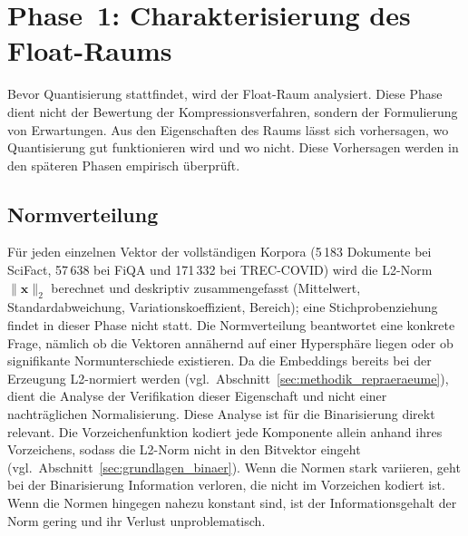 \section{Phase~1: Charakterisierung des Float-Raums}
\label{sec:methodik_phase1}
%
Bevor Quantisierung stattfindet, wird der Float-Raum analysiert.
Diese Phase dient nicht der Bewertung der Kompressionsverfahren, sondern der Formulierung von Erwartungen.
Aus den Eigenschaften des Raums lässt sich vorhersagen, wo Quantisierung gut funktionieren wird und wo nicht.
Diese Vorhersagen werden in den späteren Phasen empirisch überprüft.
%
\subsection{Normverteilung}
%
Für jeden einzelnen Vektor der vollständigen Korpora (5\,183 Dokumente bei SciFact, 57\,638 bei FiQA und 171\,332 bei TREC-COVID) wird die L2-Norm $\|\mathbf{x}\|_2$ berechnet und deskriptiv zusammengefasst (Mittelwert, Standardabweichung, Variationskoeffizient, Bereich); eine Stichprobenziehung findet in dieser Phase nicht statt.
Die Normverteilung beantwortet eine konkrete Frage, nämlich ob die Vektoren annähernd auf einer Hypersphäre liegen oder ob signifikante Normunterschiede existieren.
Da die Embeddings bereits bei der Erzeugung L2-normiert werden (vgl.\ Abschnitt~\ref{sec:methodik_repraeraeume}), dient die Analyse der Verifikation dieser Eigenschaft und nicht einer nachträglichen Normalisierung.
%
Diese Analyse ist für die Binarisierung direkt relevant.
Die Vorzeichenfunktion kodiert jede Komponente allein anhand ihres Vorzeichens, sodass die L2-Norm nicht in den Bitvektor eingeht (vgl.\ Abschnitt~\ref{sec:grundlagen_binaer}).
Wenn die Normen stark variieren, geht bei der Binarisierung Information verloren, die nicht im Vorzeichen kodiert ist.
Wenn die Normen hingegen nahezu konstant sind, ist der Informationsgehalt der Norm gering und ihr Verlust unproblematisch.
%
